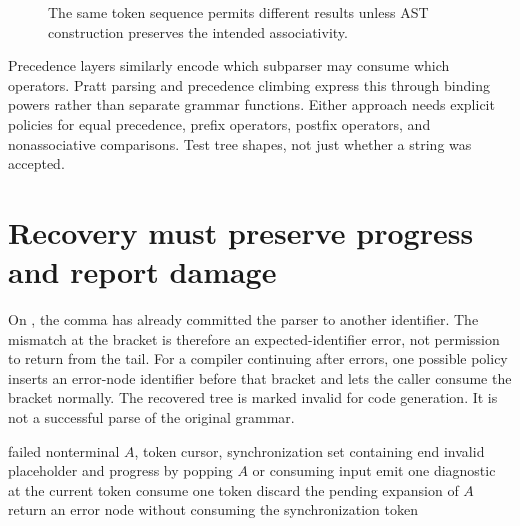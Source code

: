 \begin{figure}[htbp]
\centering
{}
\caption{The same token sequence permits different results unless AST construction preserves the intended associativity.}
\label{fig:ch50-assoc}
\end{figure}

Precedence layers similarly encode which subparser may consume which operators.
Pratt parsing and precedence climbing express this through binding powers rather than separate grammar functions.
Either approach needs explicit policies for equal precedence, prefix operators, postfix operators, and nonassociative comparisons.
Test tree shapes, not just whether a string was accepted.

\section{Recovery must preserve progress and report damage}
\label{sec:ch50-recovery}

On \code{[id,]}, the comma has already committed the parser to another identifier.
The mismatch at the bracket is therefore an expected-identifier error, not permission to return from the tail.
For a compiler continuing after errors, one possible policy inserts an error-node identifier before that bracket and lets the caller consume the bracket normally.
The recovered tree is marked invalid for code generation.
It is not a successful parse of the original grammar.

\begin{algorithm}[htbp]
\caption{Synchronize a failed nonterminal without consuming a caller's delimiter.}
\label{alg:ch50-recover}
\begin{pseudocode}
\Require failed nonterminal $A$, token cursor, synchronization set containing end
\Ensure invalid placeholder and progress by popping $A$ or consuming input
\State emit one diagnostic at the current token
  \State consume one token
\EndWhile
\State discard the pending expansion of $A$
\State return an error node without consuming the synchronization token
\end{pseudocode}
\end{algorithm}

